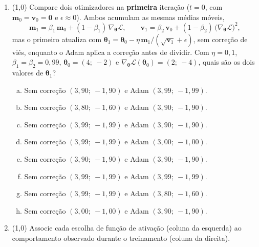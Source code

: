 \documentclass[11pt,a4paper]{article}
\begin{document}
\begin{enumerate}[1)]
\item (1{,}0) Compare dois otimizadores na \textbf{primeira} iteração ($t = 0$, com $\mathbf{m}_0 = \mathbf{v}_0 = \mathbf{0}$ e $\epsilon \approx 0$). Ambos acumulam as mesmas médias móveis,
\[
\mathbf{m}_{1} = \beta_1\,\mathbf{m}_{0} + (1 - \beta_1)\,\nabla_{\boldsymbol{\theta}}\mathcal{L}, \qquad
\mathbf{v}_{1} = \beta_2\,\mathbf{v}_{0} + (1 - \beta_2)\,\bigl(\nabla_{\boldsymbol{\theta}}\mathcal{L}\bigr)^{2} ,
\]
mas o primeiro atualiza com $\boldsymbol{\theta}_{1} = \boldsymbol{\theta}_{0} - \eta\,\mathbf{m}_{1} / (\sqrt{\mathbf{v}_{1}} + \epsilon)$, sem correção de viés, enquanto o Adam aplica a correção antes de dividir. Com $\eta = 0{,}1$, $\beta_1 = \beta_2 = 0{,}99$, $\boldsymbol{\theta}_0 = (4;\ -2)$ e $\nabla_{\boldsymbol{\theta}}\mathcal{L}(\boldsymbol{\theta}_0) = (2;\ -4)$, quais são os dois valores de $\boldsymbol{\theta}_1$?
\begin{enumerate}[a)]
    \item Sem correção $(3{,}90;\ -1{,}90)$ e Adam $(3{,}99;\ -1{,}99)$.
    \item Sem correção $(3{,}80;\ -1{,}60)$ e Adam $(3{,}90;\ -1{,}90)$.
    \item Sem correção $(3{,}99;\ -1{,}99)$ e Adam $(3{,}90;\ -1{,}90)$.
    \item Sem correção $(3{,}99;\ -1{,}99)$ e Adam $(3{,}00;\ -1{,}00)$.
    \item Sem correção $(3{,}90;\ -1{,}90)$ e Adam $(3{,}90;\ -1{,}90)$.
    \item Sem correção $(3{,}99;\ -1{,}99)$ e Adam $(3{,}99;\ -1{,}99)$.
    \item Sem correção $(3{,}99;\ -1{,}99)$ e Adam $(3{,}80;\ -1{,}60)$.
    \item Sem correção $(3{,}00;\ -1{,}00)$ e Adam $(3{,}90;\ -1{,}90)$.
\end{enumerate}

\pagebreak
\item (1{,}0) Associe cada escolha de função de ativação (coluna da esquerda) ao comportamento observado durante o treinamento (coluna da direita).


\end{enumerate}
\end{document}
